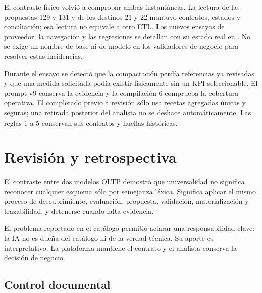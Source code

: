 \documentclass[11pt,letterpaper]{article}
\begin{document}
El contraste físico volvió a comprobar ambas instantáneas. La lectura de las
propuestas 129 y 131 y de los destinos 21 y 22 mantuvo contratos, estados y
conciliación; esa lectura no equivale a otro ETL. Los nuevos ensayos de proveedor,
la navegación y las regresiones se detallan con su estado real en
. No se exige un nombre de
base ni de modelo en los validadores de negocio para resolver estas incidencias.


Durante el ensayo se detectó que la compactación perdía referencias ya revisadas
y que una medida solicitada podía existir físicamente sin un KPI seleccionable.
El prompt v9 conserva la evidencia y la compilación 6 comprueba la cobertura
operativa. El completado previo a revisión sólo usa recetas agregadas únicas y
seguras; una retirada posterior del analista no se deshace automáticamente.
Las reglas 1 a 5 conservan sus contratos y huellas históricas.

\section{Revisión y retrospectiva}

El contraste entre dos modelos OLTP demostró que universalidad no significa reconocer
cualquier esquema sólo por semejanza léxica. Significa aplicar el mismo proceso de
descubrimiento, evaluación, propuesta, validación, materialización y trazabilidad, y detenerse
cuando falta evidencia.

El problema reportado en el catálogo permitió aclarar una responsabilidad clave: la IA no
es dueña del catálogo ni de la verdad técnica. Su aporte es interpretativo. La plataforma
mantiene el contrato y el analista conserva la decisión de negocio.

\subsection*{Control documental}
\end{document}
